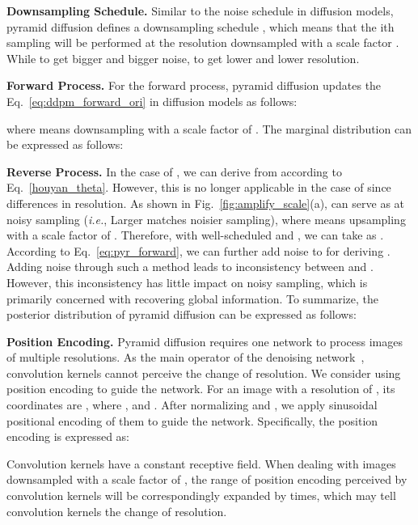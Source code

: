\documentclass{article}
\def\ie{\emph{i.e.}}
\begin{document}
\noindent \textbf{Downsampling Schedule.}
Similar to the noise schedule  in diffusion models, pyramid diffusion defines a downsampling schedule , which means that the ith sampling will be performed at the resolution downsampled with a scale factor . While  to get bigger and bigger noise,  to get lower and lower resolution. 


\noindent \textbf{Forward Process.}
For the forward process, pyramid diffusion updates the Eq.~\eqref{eq:ddpm_forward_ori} in diffusion models as follows:

where  means downsampling with a scale factor of . The marginal distribution  can be expressed as follows:


\noindent \textbf{Reverse Process.}
In the case of , we can derive  from  according to Eq.~\eqref{houyan_theta}. However, this is no longer applicable in the case of  since differences in resolution. 
As shown in Fig.~\ref{fig:amplify_scale}(a),  can serve as  at noisy sampling (\ie, Larger  matches noisier sampling), where  means upsampling with a scale factor of . 
Therefore, with well-scheduled  and , we can take  as . According to Eq.~\eqref{eq:pyr_forward}, we can further add noise to  for deriving . Adding noise through such a method leads to inconsistency between  and . However, this inconsistency has little impact on noisy sampling, which is primarily concerned with recovering global information. To summarize, the posterior distribution of pyramid diffusion can be expressed as follows:




\noindent \textbf{Position Encoding.}
Pyramid diffusion requires one network to process images of multiple resolutions. As the main operator of the denoising network~\cite{ho2020denoising}, convolution kernels cannot perceive the change of resolution. We consider using position encoding to guide the network. For an image  with a resolution of , its coordinates are , where , and . After normalizing  and , we apply sinusoidal positional encoding of them to guide the network. Specifically, the position encoding is expressed as:

Convolution kernels have a constant receptive field. When dealing with images downsampled with a scale factor of , the range of position encoding perceived by convolution kernels will be correspondingly expanded by  times, which may tell convolution kernels the change of resolution.
\end{document}
